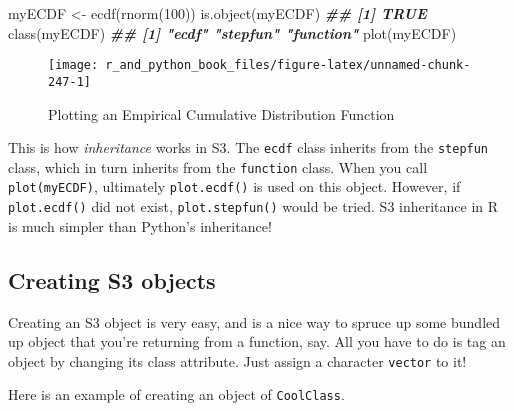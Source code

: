 \documentclass[
  12pt,
  krantz2]{krantz}
\makeatletter
\newenvironment{Shaded}{\begin{snugshade}}{\end{snugshade}}
\newcommand{\CommentTok}[1]{\textcolor[rgb]{0.37,0.37,0.37}{\textit{#1}}}
\newcommand{\DecValTok}[1]{\textcolor[rgb]{0.06,0.06,0.06}{#1}}
\newcommand{\DocumentationTok}[1]{\textcolor[rgb]{0.37,0.37,0.37}{\textbf{\textit{#1}}}}
\newcommand{\FunctionTok}[1]{\textcolor[rgb]{0,0,0}{#1}}
\newcommand{\NormalTok}[1]{#1}
\newcommand{\OtherTok}[1]{\textcolor[rgb]{0.37,0.37,0.37}{#1}}
\newcommand{\SpecialCharTok}[1]{\textcolor[rgb]{0,0,0}{#1}}
\newcommand{\StringTok}[1]{\textcolor[rgb]{0.5,0.5,0.5}{#1}}
\newenvironment{kframe}{%
\medskip{}
\setlength{\fboxsep}{.8em}
 \def\at@end@of@kframe{}%
 \ifinner\ifhmode%
  \def\at@end@of@kframe{\end{minipage}}%
  \begin{minipage}{\columnwidth}%
 \fi\fi%
 \def\FrameCommand##1{\hskip\@totalleftmargin \hskip-\fboxsep
 \colorbox{shadecolor}{##1}\hskip-\fboxsep
     \hskip-\linewidth \hskip-\@totalleftmargin \hskip\columnwidth}%
 \MakeFramed {\advance\hsize-\width
   \@totalleftmargin\z@ \linewidth\hsize
   \@setminipage}}%
 {\par\unskip\endMakeFramed%
 \at@end@of@kframe}
\renewenvironment{Shaded}{\begin{kframe}}{\end{kframe}}
\makeatother
\begin{document}
\begin{Shaded}
\begin{Highlighting}[]
\NormalTok{myECDF }\OtherTok{\textless{}{-}} \FunctionTok{ecdf}\NormalTok{(}\FunctionTok{rnorm}\NormalTok{(}\DecValTok{100}\NormalTok{))}
\FunctionTok{is.object}\NormalTok{(myECDF)}
\DocumentationTok{\#\# [1] TRUE}
\FunctionTok{class}\NormalTok{(myECDF)}
\DocumentationTok{\#\# [1] "ecdf"     "stepfun"  "function"}
\FunctionTok{plot}\NormalTok{(myECDF)}
\end{Highlighting}
\end{Shaded}

\begin{figure}

{\centering \texttt{[image: r\_and\_python\_book\_files/figure-latex/unnamed-chunk-247-1]} 

}

\caption{Plotting an Empirical Cumulative Distribution Function}\label{fig:unnamed-chunk-247}
\end{figure}

This is how \emph{inheritance} works in S3. The \texttt{ecdf} class inherits from the \texttt{stepfun} class, which in turn inherits from the \texttt{function} class. When you call \texttt{plot(myECDF)}, ultimately \texttt{plot.ecdf()} is used on this object. However, if \texttt{plot.ecdf()} did not exist, \texttt{plot.stepfun()} would be tried. S3 inheritance in R is much simpler than Python's inheritance!

\hypertarget{creating-s3-objects}{%
\subsection{Creating S3 objects}\label{creating-s3-objects}}

Creating an S3 object is very easy, and is a nice way to spruce up some bundled up object that you're returning from a function, say. All you have to do is tag an object by changing its class attribute. Just assign a character \texttt{vector} to it!

Here is an example of creating an object of \texttt{CoolClass}.

\begin{Shaded}
\end{Shaded}
\end{document}
